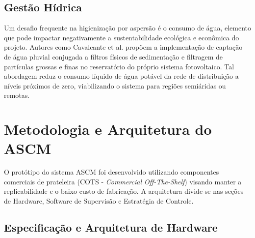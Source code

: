 \documentclass[12pt, a4paper]{article}
\begin{document}
\subsection{Gestão Hídrica}

Um desafio frequente na higienização por aspersão é o consumo de água, elemento que pode impactar negativamente a sustentabilidade ecológica e econômica do projeto. Autores como Cavalcante et al. \cite{cavalcante2016} propõem a implementação de captação de água pluvial conjugada a filtros físicos de sedimentação e filtragem de partículas grossas e finas no reservatório do próprio sistema fotovoltaico. Tal abordagem reduz o consumo líquido de água potável da rede de distribuição a níveis próximos de zero, viabilizando o sistema para regiões semiáridas ou remotas.

\section{Metodologia e Arquitetura do ASCM}

O protótipo do sistema ASCM foi desenvolvido utilizando componentes comerciais de prateleira (COTS - \textit{Commercial Off-The-Shelf}) visando manter a replicabilidade e o baixo custo de fabricação. A arquitetura divide-se nas seções de Hardware, Software de Supervisão e Estratégia de Controle.

\subsection{Especificação e Arquitetura de Hardware}
\end{document}
